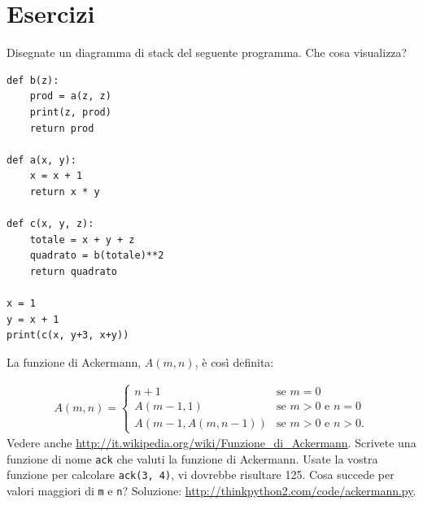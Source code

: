 \documentclass[10pt]{book}
\begin{document}
\section{Esercizi}

\begin{exercise}

Disegnate un diagramma di stack del seguente programma. Che cosa visualizza?

\begin{verbatim}
def b(z):
    prod = a(z, z)
    print(z, prod)
    return prod

def a(x, y):
    x = x + 1
    return x * y

def c(x, y, z):
    totale = x + y + z
    quadrato = b(totale)**2
    return quadrato

x = 1
y = x + 1
print(c(x, y+3, x+y))
\end{verbatim}

\end{exercise}

\vspace{0.2in}
\begin{exercise}
\label{ackermann}

La funzione di Ackermann, $A(m, n)$, è così definita:

\begin{eqnarray*}
A(m, n) = \begin{cases} 
              n+1 & \mbox{se } m = 0 \\ 
        A(m-1, 1) & \mbox{se } m > 0 \mbox{ e } n = 0 \\ 
A(m-1, A(m, n-1)) & \mbox{se } m > 0 \mbox{ e } n > 0.
\end{cases} 
\end{eqnarray*}
%
Vedere anche \url{http://it.wikipedia.org/wiki/Funzione_di_Ackermann}.
Scrivete una funzione di nome {\tt ack} che valuti la funzione di Ackermann.
Usate la vostra funzione per calcolare {\tt ack(3, 4)}, vi dovrebbe risultare 125.
Cosa succede per valori maggiori di {\tt m} e {\tt n}?
Soluzione: \url{http://thinkpython2.com/code/ackermann.py}.

\end{exercise}
\end{document}
